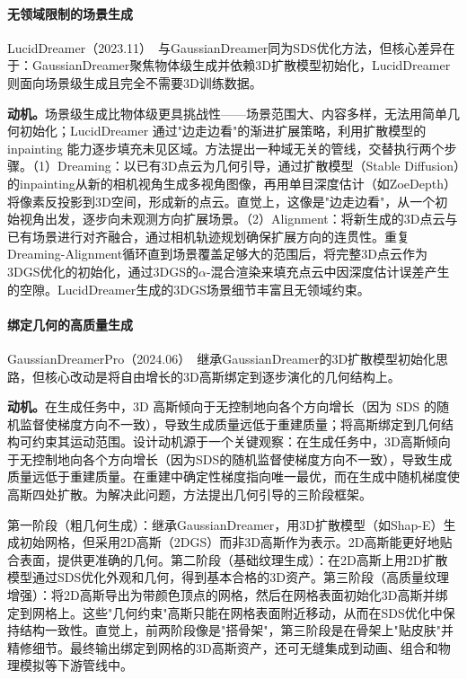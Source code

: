 \paragraph{无领域限制的场景生成}

LucidDreamer（2023.11）~\cite{2311_13384}与GaussianDreamer同为SDS优化方法，但核心差异在于：GaussianDreamer聚焦物体级生成并依赖3D扩散模型初始化，LucidDreamer则面向场景级生成且完全不需要3D训练数据。

\textbf{动机。}场景级生成比物体级更具挑战性——场景范围大、内容多样，无法用简单几何初始化；LucidDreamer 通过"边走边看"的渐进扩展策略，利用扩散模型的 inpainting 能力逐步填充未见区域。方法提出一种域无关的管线，交替执行两个步骤。（1）Dreaming：以已有3D点云为几何引导，通过扩散模型（Stable Diffusion）的inpainting从新的相机视角生成多视角图像，再用单目深度估计（如ZoeDepth）将像素反投影到3D空间，形成新的点云。直觉上，这像是"边走边看"，从一个初始视角出发，逐步向未观测方向扩展场景。（2）Alignment：将新生成的3D点云与已有场景进行对齐融合，通过相机轨迹规划确保扩展方向的连贯性。重复Dreaming-Alignment循环直到场景覆盖足够大的范围后，将完整3D点云作为3DGS优化的初始化，通过3DGS的$\alpha$-混合渲染来填充点云中因深度估计误差产生的空隙。LucidDreamer生成的3DGS场景细节丰富且无领域约束。

\paragraph{绑定几何的高质量生成}

GaussianDreamerPro（2024.06）~\cite{2406_18462}继承GaussianDreamer的3D扩散模型初始化思路，但核心改动是将自由增长的3D高斯绑定到逐步演化的几何结构上。

\textbf{动机。}在生成任务中，3D 高斯倾向于无控制地向各个方向增长（因为 SDS 的随机监督使梯度方向不一致），导致生成质量远低于重建质量；将高斯绑定到几何结构可约束其运动范围。设计动机源于一个关键观察：在生成任务中，3D高斯倾向于无控制地向各个方向增长（因为SDS的随机监督使梯度方向不一致），导致生成质量远低于重建质量。在重建中确定性梯度指向唯一最优，而在生成中随机梯度使高斯四处扩散。为解决此问题，方法提出几何引导的三阶段框架。

第一阶段（粗几何生成）：继承GaussianDreamer，用3D扩散模型（如Shap-E）生成初始网格，但采用2D高斯（2DGS）而非3D高斯作为表示。2D高斯能更好地贴合表面，提供更准确的几何。第二阶段（基础纹理生成）：在2D高斯上用2D扩散模型通过SDS优化外观和几何，得到基本合格的3D资产。第三阶段（高质量纹理增强）：将2D高斯导出为带颜色顶点的网格，然后在网格表面初始化3D高斯并绑定到网格上。这些"几何约束"高斯只能在网格表面附近移动，从而在SDS优化中保持结构一致性。直觉上，前两阶段像是"搭骨架"，第三阶段是在骨架上"贴皮肤"并精修细节。最终输出绑定到网格的3D高斯资产，还可无缝集成到动画、组合和物理模拟等下游管线中。

